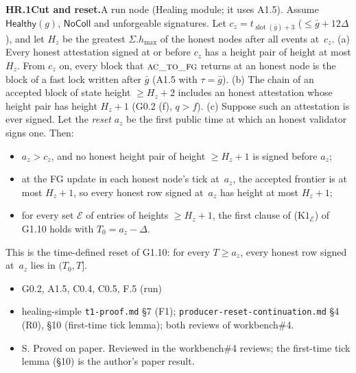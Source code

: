 \documentclass{article}
\newcommand{\slot}{\operatorname{slot}}
\newcommand{\hmax}{h_{\max}}
\newcommand{\fname}[1]{\text{\textsc{#1}}}
\newcommand{\dagnode}[6]{%
\par\medskip\noindent\textbf{#1\enspace #2.}\enspace #3
\begin{itemize}[leftmargin=2.2em,itemsep=0pt,topsep=2pt]
\item[\emph{Uses}] #4
\item[\emph{Evid.}] #5
\item[\emph{Task}] #6
\end{itemize}}
\begin{document}
\dagnode{HR.1}{Cut and reset}{A run node (Healing module; it uses A1.5).
Assume $\mathsf{Healthy}(g)$, $\mathsf{NoColl}$ and unforgeable signatures.
Let $c_z=t_{\slot(\bar g)+3}$ ($\leq\bar g+12\Delta$), and let $H_z$ be the
greatest $\Sigma.\hmax$ of the honest nodes after all events at~$c_z$.
(a) Every honest attestation signed at or before $c_z$ has a height pair of
height at most $H_z$.  From $c_z$ on, every block that $\fname{ac\_to\_fg}$
returns at an honest node is the block of a fast lock written after
$\bar g$ (A1.5 with $\tau=\bar g$).
(b) The chain of an accepted block of state height $\geq H_z+2$ includes an
honest attestation whose height pair has height $H_z+1$ (G0.2 (f), $q>f$).
(c) Suppose such an attestation is ever signed.  Let the \emph{reset} $a_z$
be the first public time at which an honest validator signs one.  Then:
\begin{itemize}[itemsep=0pt,topsep=2pt]
\item $a_z>c_z$, and no honest height pair of height $\geq H_z+1$ is signed
  before $a_z$;
\item at the FG update in each honest node's tick at~$a_z$, the accepted
  frontier is at most $H_z+1$, so every honest row signed at~$a_z$ has height
  at most $H_z+1$;
\item for every set $\mathcal E$ of entries of heights $\geq H_z+1$, the
  first clause of ($\mathrm K1_{\mathcal E}$) of G1.10 holds with
  $T_0=a_z-\Delta$.
\end{itemize}
This is the time-defined reset of G1.10: for every $T\geq a_z$, every honest
row signed at~$a_z$ lies in $(T_0,T]$.}
{G0.2, A1.5, C0.4, C0.5, F.5 (run)}
{healing-simple \texttt{t1-proof.md} \S7 (F1); \texttt{producer-reset-continuation.md}
\S4 (R0), \S10 (first-time tick lemma); both reviews of workbench\#4.}
{S.  Proved on paper.  Reviewed in the workbench\#4 reviews; the first-time
tick lemma (\S10) is the author's paper result.}
\end{document}

